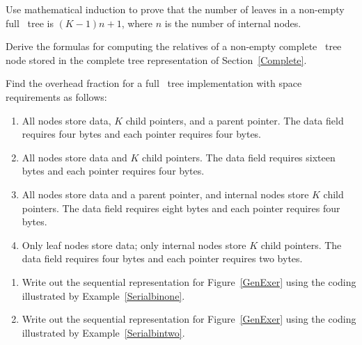 \begin{exercises}
\item
Use mathematical induction to prove that the number
of leaves in a non-empty full \Kary\ tree is \((K-1)n + 1\), where \(n\)
is the number of internal nodes.

\item
Derive the formulas for computing the relatives of a non-empty
complete \Kary\ tree node stored in the complete tree representation
of Section~\ref{Complete}.

\item
Find the overhead fraction for a full \Kary\ tree implementation with
space requirements as follows:

\begin{enumerate}

\item
All nodes store data, \(K\) child pointers, and a parent pointer.
The data field requires four bytes and each pointer requires four
bytes.

\item
All nodes store data and \(K\) child pointers.
The data field requires sixteen bytes and each pointer requires four
bytes.

\item
All nodes store data and a parent pointer,
and internal nodes store \(K\) child pointers.
The data field requires eight bytes and each pointer requires four
bytes.

\item
Only leaf nodes store data; only internal nodes store \(K\) child
pointers.
The data field requires four bytes and each pointer requires two
bytes.
\end{enumerate}

\item
\label{GenSeqExer}
\begin{enumerate}
\item
Write out the sequential
representation for Figure~\ref{GenExer}
using the coding illustrated by Example~\ref{Serialbinone}.

\item
Write out the sequential representation for Figure~\ref{GenExer}
using the coding illustrated by Example~\ref{Serialbintwo}.
\end{enumerate}

\begin{figure}
\vspace{-\bigskipamount}\vspace{-\smallskipamount}


\end{figure}
\end{exercises}
